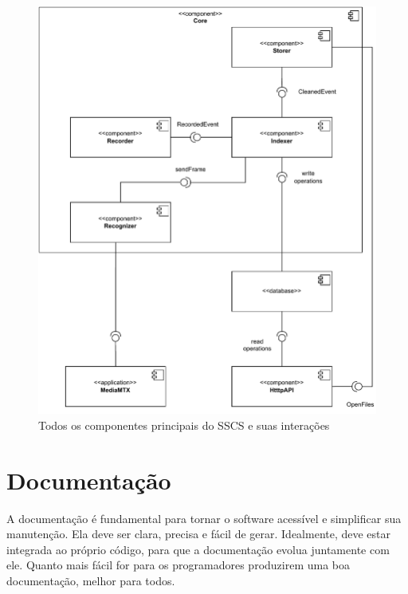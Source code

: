 \documentclass[12pt, %
openright, 
oneside, %
a4paper,    %
brazil]{facom-ufu-abntex2}
\begin{document}
\begin{figure}[!ht]
	\centering
	\includegraphics[width=1.0\linewidth]{core.pdf}
	\caption[Diagrama geral do SSCS]{Todos os componentes principais do
		SSCS e suas interações}
	\label{fig:diaSSCS}
\end{figure}


\section{Documentação}

A documentação é fundamental para tornar o software acessível e simplificar sua
manutenção. Ela deve ser clara, precisa e fácil de gerar. Idealmente, deve
estar integrada ao próprio código, para que a documentação evolua juntamente
com ele. Quanto mais fácil for para os programadores produzirem uma boa
documentação, melhor para todos.
\end{document}
